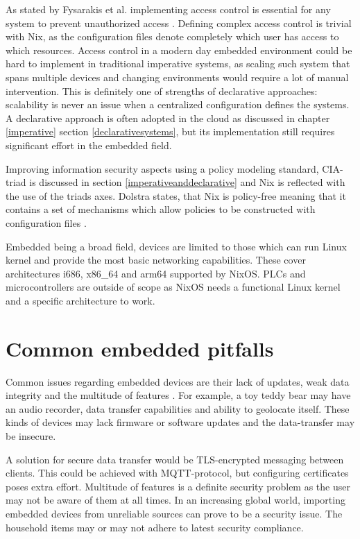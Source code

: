 As stated by Fysarakis et al. implementing access control is essential
for any system to prevent unauthorized access
\cite{fysarakis2014embedded}. Defining complex access control is
trivial with Nix, as the configuration files denote completely which
user has access to which resources. Access control in a modern day
embedded environment could be hard to implement in traditional
imperative systems, as scaling such system that spans multiple devices
and changing environments would require a lot of manual
intervention. This is definitely one of strengths of declarative
approaches: scalability is never an issue when a centralized
configuration defines the systems. A declarative approach is often
adopted in the cloud as discussed in chapter \ref{imperative}
section \ref{declarativesystems}, but its implementation still
requires significant effort in the embedded field.

Improving information security aspects using a policy
modeling standard, CIA-triad is discussed in section
\ref{imperativeanddeclarative} and Nix is reflected with the use of
the triads axes. Dolstra states, that Nix is policy-free meaning that
it contains a set of mechanisms which allow policies to be constructed
with configuration files \cite{dolstra2004nix}.

Embedded being a broad field,  devices are limited to
those which can run Linux kernel and provide the most basic networking
capabilities. These cover architectures i686, x86\_64 and arm64 supported
by NixOS. PLCs and microcontrollers are outside of scope as NixOS
needs a functional Linux kernel and a specific architecture to work.

\section{Common embedded pitfalls}

Common issues regarding embedded devices are their lack of updates,
weak data integrity and the multitude of features
\cite{kemmerer2003cybersecurity, fysarakis2014embedded}. For example,
a toy teddy bear may have an audio recorder, data transfer capabilities
and ability to geolocate itself. These kinds of devices may lack
firmware or software updates and the data-transfer may be insecure.

A solution for secure data transfer would be TLS-encrypted messaging
between clients. This could be achieved with MQTT-protocol, but
configuring certificates poses extra effort. Multitude of features is a
definite security problem as the user may not be aware of them at all
times. In an increasing global world, importing embedded devices from
unreliable sources can prove to be a security issue. The household
items may or may not adhere to latest security
compliance. \cite{fysarakis2014embedded}

